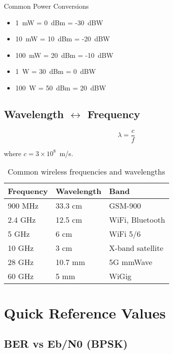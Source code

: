 \begin{calloutbox}{Common Power Conversions}
\begin{itemize}
\item 1~mW = 0~dBm = -30~dBW
\item 10~mW = 10~dBm = -20~dBW
\item 100~mW = 20~dBm = -10~dBW
\item 1~W = 30~dBm = 0~dBW
\item 100~W = 50~dBm = 20~dBW
\end{itemize}
\end{calloutbox}

\subsection{Wavelength $\leftrightarrow$ Frequency}
\label{subsec:wavelength-frequency}

\begin{equation}
\label{eq:wavelength}
\lambda = \frac{c}{f}
\end{equation}

where $c = 3 \times 10^8$~m/s.

\begin{table}[h]
\centering
\begin{tabular}{@{}lll@{}}
\toprule
\textbf{Frequency} & \textbf{Wavelength} & \textbf{Band} \\
\midrule
900 MHz & 33.3 cm & GSM-900 \\
2.4 GHz & 12.5 cm & WiFi, Bluetooth \\
5 GHz & 6 cm & WiFi 5/6 \\
10 GHz & 3 cm & X-band satellite \\
28 GHz & 10.7 mm & 5G mmWave \\
60 GHz & 5 mm & WiGig \\
\bottomrule
\end{tabular}
\caption{Common wireless frequencies and wavelengths}
\label{tab:freq-wavelength}
\end{table}

\section{Quick Reference Values}
\label{sec:quick-reference}

\subsection{BER vs Eb/N0 (BPSK)}
\label{subsec:ber-table}

